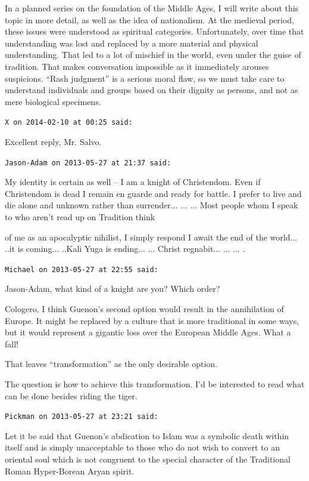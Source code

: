 \begin{footnotesize}
\begin{sffamily}
In a planned series on the foundation of the Middle Ages, I will write about this topic in more detail, as well as the idea of nationalism. At the medieval period, these issues were understood as spiritual categories. Unfortunately, over time that understanding was lost and replaced by a more material and physical understanding. That led to a lot of mischief in the world, even under the guise of tradition. That makes conversation impossible as it immediately arouses suspicions. ``Rash judgment'' is a serious moral flaw, so we must take care to understand individuals and groups based on their dignity as persons, and not as mere biological specimens.

\hfill

\texttt{X on 2014-02-10 at 00:25 said:}

Excellent reply, Mr. Salvo.

\texttt{Jason-Adam on 2013-05-27 at 21:37 said:}

My identity is certain as well -- I am a knight of Christendom. Even if Christendom is dead I remain en guarde and ready for battle. I prefer to live and die alone and unknown rather than surrender... ... ... Most people whom I speak to who aren't read up on Tradition think

of me as an apocalyptic nihilist, I simply respond I await the end of the world... ..it is coming... ..Kali Yuga is ending... ... Christ regnabit... ... ... .

\hfill

\texttt{Michael on 2013-05-27 at 22:55 said:}

Jason-Adam, what kind of a knight are you? Which order?

Cologero, I think Guenon's second option would result in the annihilation of Europe. It might be replaced by a culture that is more traditional in some ways, but it would represent a gigantic loss over the European Middle Ages. What a fall!

That leaves ``transformation'' as the only desirable option.

The question is how to achieve this transformation. I'd be interested to read what can be done besides riding the tiger.

\hfill

\texttt{Pickman on 2013-05-27 at 23:21 said:}

Let it be said that Guenon's abdication to Islam was a symbolic death within itself and is simply unacceptable to those who do not wish to convert to an oriental soul which is not congruent to the special character of the Traditional Roman Hyper-Borean Aryan spirit.


\end{sffamily}
\end{footnotesize}
